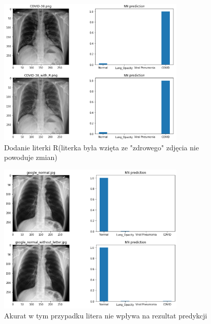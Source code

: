 \documentclass{article}
\begin{document}
\begin{figure}[H]
	\centering
	\includegraphics[width=0.8\textwidth,keepaspectratio=true]{covid_R_exp}
	\caption{Dodanie literki R(literka była wzięta ze "zdrowego" zdjęcia nie powoduje zmian)}
	\label{}
\end{figure}

\begin{figure}[H]
	\centering
	\includegraphics[width=0.8\textwidth,keepaspectratio=true]{google_normal_L_exp}
	\caption{Akurat w tym przypadku litera nie wpływa na rezultat predykcji}
	\label{}
\end{figure}



\end{document}

